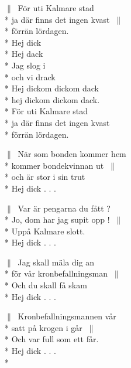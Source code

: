 \begin{SongText}[Kalmarevisan]
    \begin{SongVerse}
        $\|\:$ För uti Kalmare stad\\*%
        ja där finns det ingen kvast $\:\|$\\*%
        förrän lördagen.\\*%
        Hej dick\\*%
        Hej dack\\*%
        Jag slog i\\*%
        och vi drack\\*%
        Hej dickom dickom dack\\*%
        hej dickom dickom dack.\\*%
        För uti Kalmare stad\\*%
        ja där finns det ingen kvast\\*%
        förrän lördagen.
    \end{SongVerse}
    \begin{SongVerse}
        $\|\:$ När som bonden kommer hem\\*%
        kommer bondekvinnan ut $\:\|$\\*%
        och är stor i sin trut\\*%
        Hej dick . . .
    \end{SongVerse}
    \begin{SongVerse}
        $\|\:$ Var är pengarna du fått ?\\*%
        Jo, dom har jag supit opp ! $\:\|$\\*%
        Uppå Kalmare slott.\\*%
        Hej dick . . .
    \end{SongVerse}
    \begin{SongVerse}
        $\|\:$ Jag skall mäla dig an\\*%
        för vår kronbefallningsman $\:\|$\\*%
        Och du skall få skam\\*%
        Hej dick . . .
    \end{SongVerse}
    \begin{SongVerse}
        $\|\:$ Kronbefallningsmannen vår\\*%
        satt på krogen i går $\:\|$\\*%
        Och var full som ett får.\\*%
        Hej dick . . .\\*%
    \end{SongVerse}

\end{SongText}
